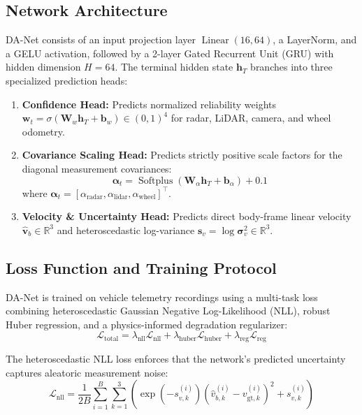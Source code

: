 \documentclass[lettersize,journal]{IEEEtran}
\begin{document}
\subsection{Network Architecture}
DA-Net consists of an input projection layer $\operatorname{Linear}(16, 64)$, a LayerNorm, and a GELU activation, followed by a 2-layer Gated Recurrent Unit (GRU) with hidden dimension $H = 64$. 
The terminal hidden state $\mathbf{h}_T$ branches into three specialized prediction heads:
\begin{enumerate}
    \item \textbf{Confidence Head:} Predicts normalized reliability weights $\mathbf{w}_t = \sigma(\mathbf{W}_w \mathbf{h}_T + \mathbf{b}_w) \in (0, 1)^4$ for radar, LiDAR, camera, and wheel odometry.
    \item \textbf{Covariance Scaling Head:} Predicts strictly positive scale factors for the diagonal measurement covariances:
    \begin{equation}
    \boldsymbol{\alpha}_t = \operatorname{Softplus}(\mathbf{W}_\alpha \mathbf{h}_T + \mathbf{b}_\alpha) + 0.1
    \end{equation}
    where $\boldsymbol{\alpha}_t = [\alpha_{\mathrm{radar}}, \alpha_{\mathrm{lidar}}, \alpha_{\mathrm{wheel}}]^\top$.
    \item \textbf{Velocity & Uncertainty Head:} Predicts direct body-frame linear velocity $\hat{\mathbf{v}}_b \in \mathbb{R}^3$ and heteroscedastic log-variance $\mathbf{s}_v = \log \boldsymbol{\sigma}_v^2 \in \mathbb{R}^3$.
\end{enumerate}

\subsection{Loss Function and Training Protocol}
DA-Net is trained on vehicle telemetry recordings using a multi-task loss combining heteroscedastic Gaussian Negative Log-Likelihood (NLL), robust Huber regression, and a physics-informed degradation regularizer:
\begin{equation}
\mathcal{L}_{\mathrm{total}} = \lambda_{\mathrm{nll}} \mathcal{L}_{\mathrm{nll}} + \lambda_{\mathrm{huber}} \mathcal{L}_{\mathrm{huber}} + \lambda_{\mathrm{reg}} \mathcal{L}_{\mathrm{reg}}
\end{equation}

The heteroscedastic NLL loss enforces that the network's predicted uncertainty captures aleatoric measurement noise:
\begin{equation}
\mathcal{L}_{\mathrm{nll}} = \frac{1}{2 B} \sum_{i=1}^B \sum_{k=1}^3 \left( \exp(-s_{v, k}^{(i)}) (\hat{v}_{b, k}^{(i)} - v_{\mathrm{gt}, k}^{(i)})^2 + s_{v, k}^{(i)} \right)
\end{equation}
\end{document}
